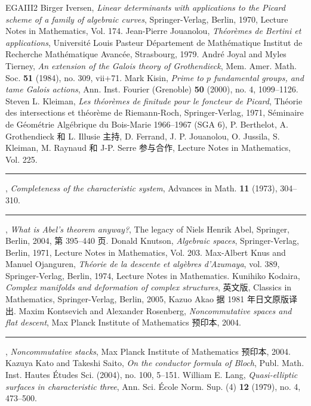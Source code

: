 \begin{thebibliography}{EGAIII2}
 Birger Iversen, \emph{Linear determinants with applications to the Picard scheme of a family of algebraic curves}, Springer-Verlag, Berlin, 1970, Lecture Notes in Mathematics, Vol. 174.
 Jean-Pierre Jouanolou, \emph{Théorèmes de Bertini et applications}, Université Louis Pasteur Département de Mathématique Institut de Recherche Mathématique Avancée, Strasbourg, 1979.
 André Joyal and Myles Tierney, \emph{An extension of the Galois theory of Grothendieck}, Mem. Amer. Math. Soc. \textbf{51} (1984), no. 309, vii+71.
 Mark Kisin, \emph{Prime to $p$ fundamental groups, and tame Galois actions}, Ann. Inst. Fourier (Grenoble) \textbf{50} (2000), no. 4, 1099--1126.
 Steven L. Kleiman, \emph{Les théorèmes de finitude pour le foncteur de Picard}, Théorie des intersections et théorème de Riemann-Roch, Springer-Verlag, 1971, Séminaire de Géométrie Algébrique du Bois-Marie 1966--1967 (SGA 6), P. Berthelot, A. Grothendieck 和 L. Illusie 主持, D. Ferrand, J. P. Jouanolou, O. Jussila, S. Kleiman, M. Raynaud 和 J-P. Serre 参与合作, Lecture Notes in Mathematics, Vol. 225.
 \rule{2em}{.3pt}, \emph{Completeness of the characteristic system}, Advances in Math. \textbf{11} (1973), 304--310.
 \rule{2em}{.3pt}, \emph{What is Abel's theorem anyway?}, The legacy of Niels Henrik Abel, Springer, Berlin, 2004, 第 395--440 页.
 Donald Knutson, \emph{Algebraic spaces}, Springer-Verlag, Berlin, 1971, Lecture Notes in Mathematics, Vol. 203.
 Max-Albert Knus and Manuel Ojanguren, \emph{Théorie de la descente et algèbres d'Azumaya}, vol. 389, Springer-Verlag, Berlin, 1974, Lecture Notes in Mathematics.
 Kunihiko Kodaira, \emph{Complex manifolds and deformation of complex structures}, 英文版, Classics in Mathematics, Springer-Verlag, Berlin, 2005, Kazuo Akao 据 1981 年日文原版译出.
 Maxim Kontsevich and Alexander Rosenberg, \emph{Noncommutative spaces and flat descent}, Max Planck Institute of Mathematics 预印本, 2004.
 \rule{2em}{.3pt}, \emph{Noncommutative stacks}, Max Planck Institute of Mathematics 预印本, 2004.
 Kazuya Kato and Takeshi Saito, \emph{On the conductor formula of Bloch}, Publ. Math. Inst. Hautes Études Sci. (2004), no. 100, 5--151.
 William E. Lang, \emph{Quasi-elliptic surfaces in characteristic three}, Ann. Sci. École Norm. Sup. (4) \textbf{12} (1979), no. 4, 473--500.

\end{thebibliography}
